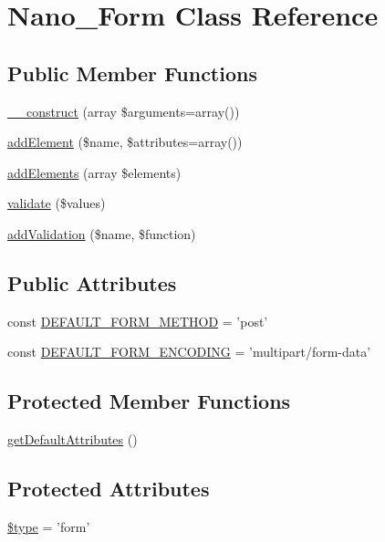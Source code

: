 \hypertarget{classNano__Form}{
\section{Nano\_\-Form Class Reference}
\label{classNano__Form}
}
\subsection*{Public Member Functions}
\begin{CompactItemize}
\item 
\hyperlink{classNano__Form_f574966ae982f1bcf5703966992d946f}{\_\-\_\-construct} (array \$arguments=array())
\item 
\hyperlink{classNano__Form_3e71c491f18020b5c574eb7e230e21d0}{addElement} (\$name, \$attributes=array())
\item 
\hyperlink{classNano__Form_31801b2ad37c185877c49a28d31e2094}{addElements} (array \$elements)
\item 
\hyperlink{classNano__Form_35783283818c41ff4e1917a66c258651}{validate} (\$values)
\item 
\hyperlink{classNano__Form_4d551db84f56be678f9b7cd3c289f7ee}{addValidation} (\$name, \$function)
\end{CompactItemize}
\subsection*{Public Attributes}
\begin{CompactItemize}
\item 
const \hyperlink{classNano__Form_67b6658589824e3752dca005237f5915}{DEFAULT\_\-FORM\_\-METHOD} = 'post'
\item 
const \hyperlink{classNano__Form_878c4634a213832b49108d0c26ef05c3}{DEFAULT\_\-FORM\_\-ENCODING} = 'multipart/form-data'
\end{CompactItemize}
\subsection*{Protected Member Functions}
\begin{CompactItemize}
\item 
\hyperlink{classNano__Form_8bb0fe1b14babd93577a77ec0620a988}{getDefaultAttributes} ()
\end{CompactItemize}
\subsection*{Protected Attributes}
\begin{CompactItemize}
\item 
\hyperlink{classNano__Form_c6b608a82ddd34cff161c5e34d384fea}{\$type} = 'form'
\end{CompactItemize}
